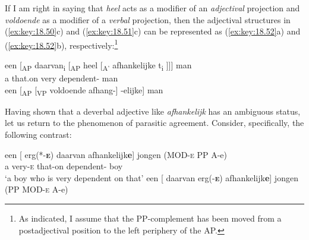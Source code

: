 \documentclass[output=paper]{langsci/langscibook}
\begin{document}
\ea%
    \label{ex:key:18.51}
	\z
\z\newpage

If I am right in saying that \emph{heel} acts as a modifier of an
\emph{adjectival} projection and \emph{voldoende} as a modifier of a
\emph{verbal} projection, then the adjectival structures in (\ref{ex:key:18.50}c)
and (\ref{ex:key:18.51}c) can be represented as (\ref{ex:key:18.52}a) and
(\ref{ex:key:18.52}b), respectively:\footnote{As indicated, I assume that the
PP-complement has been moved from a postadjectival position to the left
periphery of the AP.}

\ea%
    \label{ex:key:18.52}
	\ea
	\gll een [\textsubscript{AP} daarvan\textsubscript{i} [\textsubscript{AP} heel [\textsubscript{A'} afhankelijke t\textsubscript{i} ]]] man\\
    a {} that.on {} very {} dependent-\Agr{} {} {} man\\
	\ex een [\textsubscript{AP} [\textsubscript{VP}  voldoende  afhang-] -elijke] man
	\z
\z

Having shown that a deverbal adjective like \emph{afhankelijk} has an ambiguous
status, let us return to the phenomenon of parasitic agreement. Consider,
specifically, the following contrast:

\ea%
    \label{ex:key:18.53}
	\ea
	\gll een [ erg(*-\textbf{\textsc{e}})    daarvan    afhankelijk\textbf{e}]      jongen        (MOD-\textsc{e} PP A-e)\\
    a   {}     very-\textsc{e}        that-on    dependent-\Agr{}    boy\\
	\glt \enquote*{a boy who is very dependent on that}
	\ex een [ daarvan erg(-\textbf{\textsc{e}}) afhankelijk\textbf{e}] jongen                  (PP MOD-\textsc{e} A-e)
	\z
\z
\end{document}
